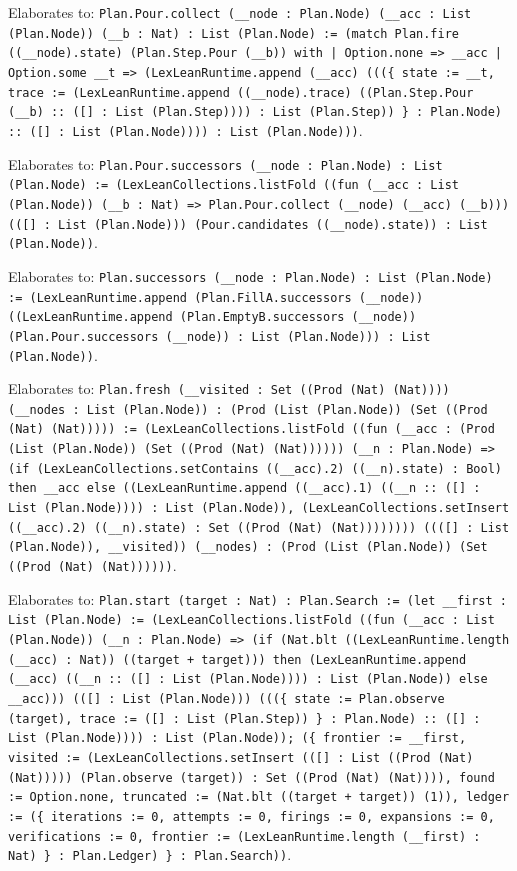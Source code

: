 \documentclass[11pt]{article}
\begin{document}
\noindent Elaborates to: \texttt{Plan.Pour.collect (\_\_node : Plan.Node) (\_\_acc : List (Plan.Node)) (\_\_b : Nat) : List (Plan.Node) := (match Plan.fire ((\_\_node).state) (Plan.Step.Pour (\_\_b)) with | Option.none => \_\_acc | Option.some \_\_t => (LexLeanRuntime.append (\_\_acc) (((\{ state := \_\_t, trace := (LexLeanRuntime.append ((\_\_node).trace) ((Plan.Step.Pour (\_\_b) :: ([] : List (Plan.Step)))) : List (Plan.Step)) \} : Plan.Node) :: ([] : List (Plan.Node)))) : List (Plan.Node)))}.\par
\noindent Elaborates to: \texttt{Plan.Pour.successors (\_\_node : Plan.Node) : List (Plan.Node) := (LexLeanCollections.listFold ((fun (\_\_acc : List (Plan.Node)) (\_\_b : Nat) => Plan.Pour.collect (\_\_node) (\_\_acc) (\_\_b))) (([] : List (Plan.Node))) (Pour.candidates ((\_\_node).state)) : List (Plan.Node))}.\par
\noindent Elaborates to: \texttt{Plan.successors (\_\_node : Plan.Node) : List (Plan.Node) := (LexLeanRuntime.append (Plan.FillA.successors (\_\_node)) ((LexLeanRuntime.append (Plan.EmptyB.successors (\_\_node)) (Plan.Pour.successors (\_\_node)) : List (Plan.Node))) : List (Plan.Node))}.\par
\noindent Elaborates to: \texttt{Plan.fresh (\_\_visited : Set ((Prod (Nat) (Nat)))) (\_\_nodes : List (Plan.Node)) : (Prod (List (Plan.Node)) (Set ((Prod (Nat) (Nat))))) := (LexLeanCollections.listFold ((fun (\_\_acc : (Prod (List (Plan.Node)) (Set ((Prod (Nat) (Nat)))))) (\_\_n : Plan.Node) => (if (LexLeanCollections.setContains ((\_\_acc).2) ((\_\_n).state) : Bool) then \_\_acc else ((LexLeanRuntime.append ((\_\_acc).1) ((\_\_n :: ([] : List (Plan.Node)))) : List (Plan.Node)), (LexLeanCollections.setInsert ((\_\_acc).2) ((\_\_n).state) : Set ((Prod (Nat) (Nat)))))))) ((([] : List (Plan.Node)), \_\_visited)) (\_\_nodes) : (Prod (List (Plan.Node)) (Set ((Prod (Nat) (Nat))))))}.\par
\noindent Elaborates to: \texttt{Plan.start (target : Nat) : Plan.Search := (let \_\_first : List (Plan.Node) := (LexLeanCollections.listFold ((fun (\_\_acc : List (Plan.Node)) (\_\_n : Plan.Node) => (if (Nat.blt ((LexLeanRuntime.length (\_\_acc) : Nat)) ((target + target))) then (LexLeanRuntime.append (\_\_acc) ((\_\_n :: ([] : List (Plan.Node)))) : List (Plan.Node)) else \_\_acc))) (([] : List (Plan.Node))) (((\{ state := Plan.observe (target), trace := ([] : List (Plan.Step)) \} : Plan.Node) :: ([] : List (Plan.Node)))) : List (Plan.Node)); (\{ frontier := \_\_first, visited := (LexLeanCollections.setInsert (([] : List ((Prod (Nat) (Nat))))) (Plan.observe (target)) : Set ((Prod (Nat) (Nat)))), found := Option.none, truncated := (Nat.blt ((target + target)) (1)), ledger := (\{ iterations := 0, attempts := 0, firings := 0, expansions := 0, verifications := 0, frontier := (LexLeanRuntime.length (\_\_first) : Nat) \} : Plan.Ledger) \} : Plan.Search))}.\par
\end{document}
